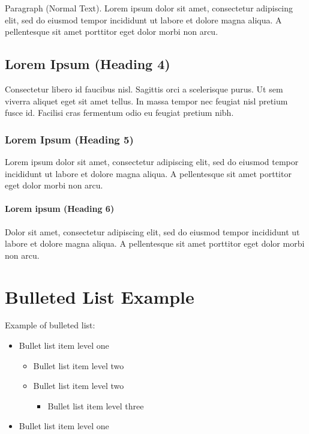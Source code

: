 \documentclass[notitlepage]{nyu22report}
\begin{document}
Paragraph (Normal Text). Lorem ipsum dolor sit amet, consectetur adipiscing
elit, sed do eiusmod tempor incididunt ut labore et dolore magna aliqua. A
pellentesque sit amet porttitor eget dolor morbi non arcu.

\subsection{Lorem Ipsum (Heading 4)}

Consectetur libero id faucibus nisl. Sagittis orci a scelerisque purus. Ut sem
viverra aliquet eget sit amet tellus. In massa tempor nec feugiat nisl pretium
fusce id. Facilisi cras fermentum odio eu feugiat pretium nibh.

\subsubsection{Lorem Ipsum (Heading 5)}

Lorem ipsum dolor sit amet, consectetur adipiscing elit, sed do eiusmod tempor
incididunt ut labore et dolore magna aliqua. A pellentesque sit amet porttitor
eget dolor morbi non arcu.

\paragraph{Lorem ipsum (Heading 6)}

Dolor sit amet, consectetur adipiscing elit, sed do eiusmod tempor incididunt ut
labore et dolore magna aliqua. A pellentesque sit amet porttitor eget dolor
morbi non arcu.

\section{Bulleted List Example}

Example of bulleted list:

\begin{itemize}
    \item Bullet list item level one
    \begin{itemize}
        \item Bullet list item level two
        \item Bullet list item level two
        \begin{itemize}
            \item Bullet list item level three
        \end{itemize}
    \end{itemize}
    \item Bullet list item level one
\end{itemize}
\end{document}
